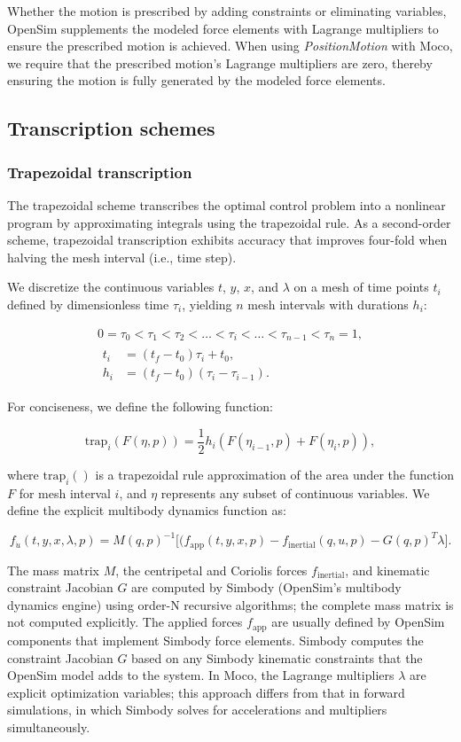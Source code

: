 \documentclass[10pt,letterpaper]{article}
\newcommand{\traptau}{
\begin{equation}
    \begin{gathered}
        0 = \tau_0 < \tau_1 < \tau_2 < \ldots < \tau_i < \ldots < \tau_{n - 1} < \tau_n = 1, \\
        \begin{aligned}
        t_i &= (t_f - t_0) \tau_i + t_0, \\
        h_i &= (t_f - t_0)(\tau_i - \tau_{i-1}).
        \end{aligned}
    \end{gathered}
\end{equation}
}
\newcommand{\trapfunc}{
\begin{equation}
    \textrm{trap}_i(F(\eta, p)) = \frac{1}{2} h_i (F(\eta_{i-1}, p) + F(\eta_i, p)),
\end{equation}
}
\newcommand{\explicitmultibody}{
\begin{equation}
    f_{\dot{u}}(t, y, x, \lambda, p) =
    M(q, p)^{-1}\big[(f_{\textrm{app}}(t, y, x, p) - f_{\textrm{inertial}}(q, u, p) - G(q, p)^T \lambda\big].
\end{equation}
}
\begin{document}
Whether the motion is prescribed by adding constraints or eliminating variables, OpenSim supplements the modeled force elements with Lagrange multipliers to ensure the prescribed motion is achieved. When using \textit{PositionMotion} with Moco, we require that the prescribed motion's Lagrange multipliers are zero, thereby ensuring the motion is fully generated by the modeled force elements.

\subsection*{Transcription schemes}

\subsubsection*{Trapezoidal transcription}

The trapezoidal scheme transcribes the optimal control problem into a nonlinear program by approximating integrals using the trapezoidal rule. As a second-order scheme, trapezoidal transcription exhibits accuracy that improves four-fold when halving the mesh interval (i.e., time step).

We discretize the continuous variables $t$, $y$, $x$, and $\lambda$ on a mesh of time points $t_i$ defined by dimensionless time $\tau_i$, yielding $n$ mesh intervals with durations $h_i$:

\traptau

For conciseness, we define the following function:

\trapfunc

where $\mathrm{trap}_i()$ is a trapezoidal rule approximation of the area under the function $F$ for mesh interval $i$, and $\eta$ represents any subset of continuous variables. We define the explicit multibody dynamics function as:

\explicitmultibody

The mass matrix $M$, the centripetal and Coriolis forces $f_\mathrm{inertial}$, and kinematic constraint Jacobian $G$ are computed by Simbody (OpenSim's multibody dynamics engine) using order-N recursive algorithms; the complete mass matrix is not computed explicitly. The applied forces $f_\mathrm{app}$ are usually defined by OpenSim components that implement Simbody force elements. Simbody computes the constraint Jacobian $G$ based on any Simbody kinematic constraints that the OpenSim model adds to the system. In Moco, the Lagrange multipliers $\lambda$ are explicit optimization variables; this approach differs from that in forward simulations, in which Simbody solves for accelerations and multipliers simultaneously.
\end{document}
